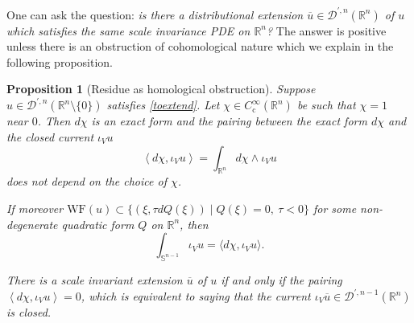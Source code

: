\documentclass[JEP,XML,SOM,Unicode]{cedram}
\let\pazocal\mathscr
\newtheorem{proposition}[theorem]{Proposition}
\theoremstyle{definition}
\newcommand\rr{{\mathbb R}}
\renewcommand\c{\mathrm{c}}
\let\st\mid
\let\Feuler V
\let\exd u
\newcommand\wf{\mathrm{WF}}
\begin{document}
One can ask the question: \emph{is there a distributional extension
$\overline{\exd}\in \pazocal{D}^{\prime,n}(\rr^n)$ of $\exd$ which satisfies the same scale invariance PDE on $\rr^n$? } The answer
is positive unless there is an obstruction of cohomological nature which we explain in the following proposition.

\begin{proposition}[Residue as homological obstruction]\label{p:residue}
Suppose \hbox{$\exd\!\in\!\pazocal{D}^{\prime,n}(\rr^n\!\setminus\!\{0\})$} satisfies \eqref{toextend}. Let $\chi\in C^\infty_\c(\rr^n)$ be such that $\chi=1$ near $0$.
Then $d\chi$ is an exact form and
the pairing between the exact form $d\chi$ and the closed current $\iota_\Feuler \exd $
\[
\left\langle d\chi, \iota_\Feuler \exd \right\rangle=\int_{\rr^n} d\chi\wedge \iota_\Feuler \exd
\]
{does not depend} on the choice of $\chi$.

If moreover $\wf(\exd)\subset \{(\xi,\tau dQ(\xi)) \st Q(\xi)=0,\ \tau<0\}$ for some non-degenerate quadratic form $Q$ on $\rr^n$, then
\[
\int_{\mathbb{S}^{n-1}} \iota_\Feuler \exd=\langle d\chi, \iota_\Feuler \exd\rangle.
\]

There is a scale invariant extension $\overline{\exd}$ of $u$ if and only if
the pairing $\left\langle d\chi, \iota_\Feuler \exd \right\rangle=0$, which is equivalent to saying that
the current $\iota_\Feuler \overline{\exd}\in \pazocal{D}^{\prime,n-1}(\rr^n)$ is closed.
\end{proposition}
\end{document}
